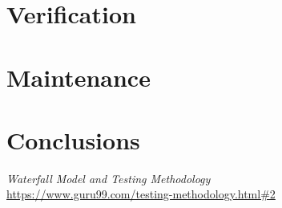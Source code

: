 \documentclass[12pt]{article}
\begin{document}
\begin{myspace}{1.7}
\section*{Verification}






%
%
\pagebreak
\section*{Maintenance}  





%
%
\pagebreak
\section*{Conclusions}  





%
%
\pagebreak
\begin{thebibliography}{9}
   \textit{Waterfall Model and Testing Methodology}\\
   \url{https://www.guru99.com/testing-methodology.html#2}

\end{thebibliography}
  
\end{myspace}
\end{document}
